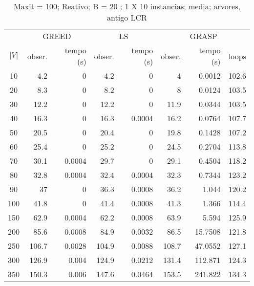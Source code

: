 \documentclass[]{article}
\begin{document}
\begin {table}[h]
\centering
\caption{\tiny{Maxit = 100; Reativo; B = 20 ; 1 X 10 instancias; media; arvores, antigo LCR}}
\begin{small}
	\begin{tabular}{|c|r|r|r|r|r|r|r|}
		\hline
		& \multicolumn{2}{c|}{GREED} & \multicolumn{2}{c|}{LS} & \multicolumn{3}{c|}{GRASP} \\ 
		\cline{2-8}
		$|V|$   &  obser. & tempo (s)  & obser. & tempo (s) & obser. & tempo (s) & loops\\ 
		\hline
		10 & 4.2 & 0 & 4.2 & 0 & 4 & 0.0012 & 102.6 \\ 
		20 & 8.3 & 0 & 8.2 & 0 & 8 & 0.0124 & 103.5 \\ 
		30 & 12.2 & 0 & 12.2 & 0 & 11.9 & 0.0344 & 103.5 \\ 
		40 & 16.3 & 0 & 16.3 & 0.0004 & 16.2 & 0.0764 & 107.7 \\ 
		50 & 20.5 & 0 & 20.4 & 0 & 19.8 & 0.1428 & 107.2 \\ 
		60 & 25.4 & 0 & 25.2 & 0 & 24.5 & 0.2704 & 113.8 \\ 
		70 & 30.1 & 0.0004 & 29.7 & 0 & 29.1 & 0.4504 & 118.2 \\ 
		80 & 32.8 & 0.0004 & 32.4 & 0.0004 & 32.3 & 0.7344 & 123.2 \\ 
		90 & 37 & 0 & 36.3 & 0.0008 & 36.2 & 1.044 & 120.2 \\ 
		100 & 41.8 & 0 & 41.4 & 0.0008 & 41.3 & 1.366 & 114.4 \\ 
		150 & 62.9 & 0.0004 & 62.2 & 0.0008 & 63.9 & 5.594 & 125.9 \\ 
		200 & 85.6 & 0.0008 & 84.9 & 0.0032 & 86.5 & 15.7508 & 121.8 \\ 
		250 & 106.7 & 0.0028 & 104.9 & 0.0088 & 108.7 & 47.0552 & 127.1 \\ 
		300 & 126.9 & 0.004 & 124.9 & 0.0212 & 131.4 & 112.871 & 124.3 \\ 
		350 & 150.3 & 0.006 & 147.6 & 0.0464 & 153.5 & 241.822 & 134.3 \\ 
		\hline
	\end{tabular} \label{}
\end{small}
\end{table}
\end{document}

